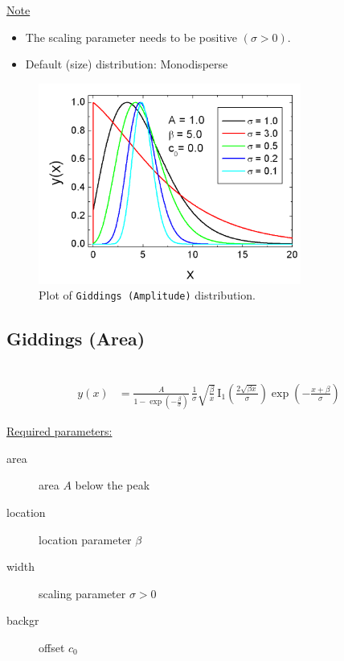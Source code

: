 \uline{Note}
\begin{itemize}
  \item The scaling parameter needs to be positive $(\sigma > 0)$.
  \item Default (size) distribution: Monodisperse
\end{itemize}

\begin{figure}[htb]
\begin{center}
\includegraphics[width=0.768\textwidth]{GiddingsAmplitude.png}
\end{center}
\caption{Plot of \texttt{Giddings (Amplitude)} distribution.}
\label{fig:GiddingsAmplitude}
\end{figure}


\clearpage
\subsection{Giddings (Area)} ~\\
\label{sec:GiddingsArea}
\begin{align}
y(x) & =  \frac{A}{1-\exp\left(-\frac{\beta}{\sigma}\right)} \,
\frac{1}{\sigma} \sqrt{\frac{\beta}{x}} \,
\mathrm{I}_1\left(\frac{2\sqrt{\beta x}}{\sigma}\right)
\exp\left(-\frac{x+\beta}{\sigma}\right)
\end{align}

\uline{Required parameters:}
\begin{description}
    \item[area] area $A$ below the peak
    \item[location] location parameter $\beta$
    \item[width] scaling parameter $\sigma > 0$
    \item[backgr] offset $c_0$
\end{description}

